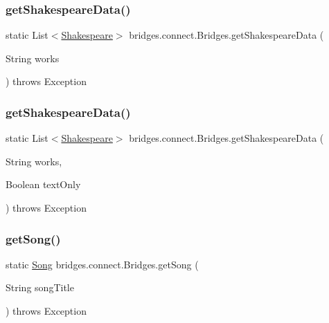 \subsubsection{\texorpdfstring{getShakespeareData()}{getShakespeareData()}\hspace{0.1cm}{\footnotesize\ttfamily [2/3]}}
{\footnotesize\ttfamily static List$<$\mbox{\hyperlink{classbridges_1_1data__src__dependent_1_1_shakespeare}{Shakespeare}}$>$ bridges.\+connect.\+Bridges.\+get\+Shakespeare\+Data (\begin{DoxyParamCaption}\item[{String}]{works }\end{DoxyParamCaption}) throws Exception\hspace{0.3cm}{\ttfamily [static]}}

\mbox{\label{classbridges_1_1connect_1_1_bridges_aa81c312e631bc76fa49e0ccae66679dc}} 
\subsubsection{\texorpdfstring{getShakespeareData()}{getShakespeareData()}\hspace{0.1cm}{\footnotesize\ttfamily [3/3]}}
{\footnotesize\ttfamily static List$<$\mbox{\hyperlink{classbridges_1_1data__src__dependent_1_1_shakespeare}{Shakespeare}}$>$ bridges.\+connect.\+Bridges.\+get\+Shakespeare\+Data (\begin{DoxyParamCaption}\item[{String}]{works,  }\item[{Boolean}]{text\+Only }\end{DoxyParamCaption}) throws Exception\hspace{0.3cm}{\ttfamily [static]}}

\mbox{\label{classbridges_1_1connect_1_1_bridges_a7f65e6648f9e66a02343a39f2fc425cb}} 
\subsubsection{\texorpdfstring{getSong()}{getSong()}\hspace{0.1cm}{\footnotesize\ttfamily [1/2]}}
{\footnotesize\ttfamily static \mbox{\hyperlink{classbridges_1_1data__src__dependent_1_1_song}{Song}} bridges.\+connect.\+Bridges.\+get\+Song (\begin{DoxyParamCaption}\item[{String}]{song\+Title }\end{DoxyParamCaption}) throws Exception\hspace{0.3cm}{\ttfamily [static]}}

